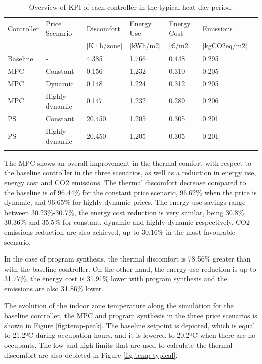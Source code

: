 \begin{table}
    \caption{Overview of KPI of each controller in the typical heat day period.}
    \label{tab:3}
    
    \centering
    \begin{tabular}{lllllll}
        \hline
        \noalign{\smallskip}
        Controller & Price Scenario & Discomfort & Energy Use & Energy Cost & Emissions  \\
        & & [K·h/zone] & [kWh/m2] & [€/m2] & [kgCO2eq/m2] \\
        \noalign{\smallskip}
        \hline
        \noalign{\smallskip}
        Baseline & - & 4.385 & 1.766 & 0.448 & 0.295 \\
        MPC & Constant & 0.156 & 1.232 & 0.310 & 0.205 \\
        MPC & Dynamic & 0.148 & 1.224 & 0.312 & 0.205 \\
        MPC & Highly dynamic & 0.147 & 1.232 & 0.289 & 0.206 \\
        PS & Constant & 20.450 & 1.205 & 0.305 & 0.201 \\
        PS & Highly dynamic & 20.450 & 1.205 & 0.305 & 0.201 \\
        \noalign{\smallskip}
        \hline
    \end{tabular}
\end{table}

The MPC shows an overall improvement in the thermal comfort with respect to the baseline controller in the three scenarios, as well as a reduction in energy use, energy cost and CO2 emissions. The thermal discomfort decrease compared to the baseline is of 96.44\% for the constant price scenario, 96.62\% when the price is dynamic, and 96.65\% for highly dynamic prices. The energy use savings range between 30.23\%-30.7\%, the energy cost reduction is very similar, being 30.8\%, 30.36\% and 35.5\% for constant, dynamic and highly dynamic respectively. CO2 emissions reduction are also achieved, up to 30.16\% in the most favourable scenario.

In the case of program synthesis, the thermal discomfort is 78.56\% greater than with the baseline controller. On the other hand, the energy use reduction is up to 31.77\%, the energy cost is 31.91\% lower with program synthesis and the emissions are also 31.86\% lower.

The evolution of the indoor zone temperature along the simulation for the baseline controller, the MPC and program synthesis in the three price scenarios is shown in Figure \ref{fig:temp-peak}. The baseline setpoint is depicted, which is equal to 21.2ºC during occupation hours, and it is lowered to 20.2ºC when there are no occupants. The low and high limits that are used to calculate the thermal discomfort are also depicted in Figure \ref{fig:temp-typical}.

